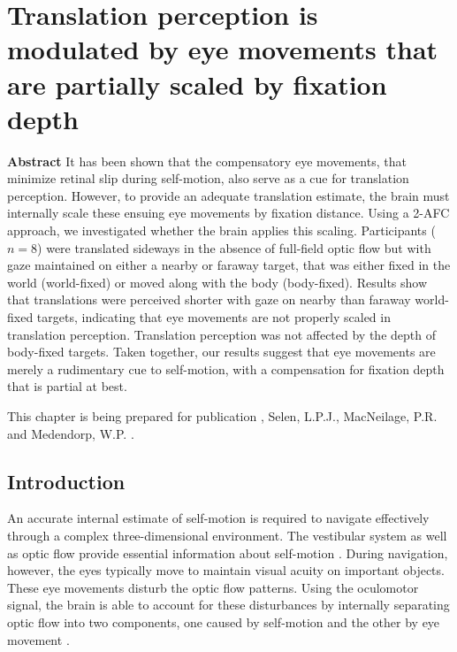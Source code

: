 \thispagestyle{empty}

\chapter{Translation perception is modulated by eye movements that are partially scaled by fixation depth}
\chaptermark{}

\newpage

\small {\bf Abstract}
It has been shown that the compensatory eye movements, that minimize retinal slip during self-motion, also serve as a cue for translation perception. However, to provide an adequate translation estimate, the brain must internally scale these ensuing eye movements by fixation distance. Using a 2-AFC approach, we investigated whether the brain applies this scaling.  Participants ($n = 8$) were translated sideways in the absence of full-field optic flow but with gaze maintained on either a nearby or faraway target, that was either fixed in the world (world-fixed) or moved along with the body (body-fixed). Results show that translations were perceived shorter with gaze on nearby than faraway world-fixed targets, indicating that eye movements are not properly scaled in translation perception. Translation perception was not affected by the depth of body-fixed targets. Taken together, our results suggest that eye movements are merely a rudimentary cue to self-motion, with a compensation for fixation depth that is partial at best.

\vfill

\noindent\underline{ \hspace{4cm} }

\noindent This chapter is being prepared for publication \newline
{}, Selen, L.P.J., MacNeilage, P.R. and Medendorp, W.P. \citeyear{clemens2015b}. %

\newpage




\section{Introduction}

An accurate internal estimate of self-motion is required to navigate effectively through a complex three-dimensional environment. The vestibular system as well as optic flow provide essential information about self-motion \cite{gibson1955, benson1986, harris2000, israel1989, angelaki2005, carriot2013, chen2010}. During navigation, however, the eyes typically move to maintain visual acuity on important objects. These eye movements disturb the optic flow patterns. Using the oculomotor signal, the brain is able to account for these disturbances by internally separating optic flow into two components, one caused by self-motion and the other by eye movement \cite{warren1988, royden1992, freeman1998, lappe1999}.

